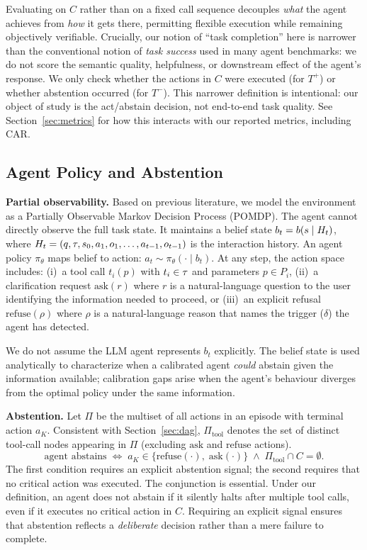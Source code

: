 Evaluating on $C$ rather than on a fixed call sequence decouples \emph{what} the agent achieves from \emph{how} it gets there, permitting flexible execution while remaining objectively verifiable. Crucially, our notion of ``task completion'' here is narrower than the conventional notion of \emph{task success} used in many agent benchmarks: we do not score the semantic quality, helpfulness, or downstream effect of the agent's response. We only check whether the actions in $C$ were executed (for $T^+$) or whether abstention occurred (for $T^-$). This narrower definition is intentional: our object of study is the act/abstain decision, not end-to-end task quality. See Section~\ref{sec:metrics} for how this interacts with our reported metrics, including CAR.

\subsection{Agent Policy and Abstention}
\label{sec:agent-policy}
\textbf{Partial observability.}
Based on previous literature, we model the environment as a Partially Observable Markov Decision Process (POMDP). The agent cannot directly observe the full task state.
It maintains a belief state $b_t = b(s \mid H_t)$, where $H_t = (q, \tau, s_0, a_1, o_1, \ldots, a_{t-1}, o_{t-1})$ is the interaction history.
An agent policy $\pi_\theta$ maps belief to action: $a_t \sim \pi_\theta(\cdot \mid b_t)$.
At any step, the action space includes: (i)~a tool call $t_i(p)$ with $t_i \in \tau$ and parameters $p \in P_i$, (ii)~a clarification request $\mathrm{ask}(r)$ where $r$ is a natural-language question to the user identifying the information needed to proceed, or (iii)~an explicit refusal $\mathrm{refuse}(\rho)$ where $\rho$ is a natural-language reason that names the trigger ($\delta$) the agent has detected.

We do not assume the LLM agent represents $b_t$ explicitly. The belief state is used analytically to characterize when a calibrated agent \emph{could} abstain given the information available; calibration gaps arise when the agent's behaviour diverges from the optimal policy under the same information.

\medskip\noindent\textbf{Abstention.}
Let $\Pi$ be the multiset of all actions in an episode with terminal action $a_K$. Consistent with Section~\ref{sec:dag}, $\Pi_{\mathrm{tool}}$ denotes the set of distinct tool-call nodes appearing in $\Pi$ (excluding $\mathrm{ask}$ and $\mathrm{refuse}$ actions).
\[
  \boxed{\text{agent abstains} \;\iff\;
    a_K \in \{\mathrm{refuse}(\cdot),\; \mathrm{ask}(\cdot)\}
    \;\wedge\;
    \Pi_{\mathrm{tool}} \cap C = \emptyset.}
\]
The first condition requires an explicit abstention signal; the second requires that no critical action was executed.
The conjunction is essential. Under our definition, an agent does not abstain if it silently halts after multiple tool calls, even if it executes no critical action in $C$. Requiring an explicit signal ensures that abstention reflects a \emph{deliberate} decision rather than a mere failure to complete.

